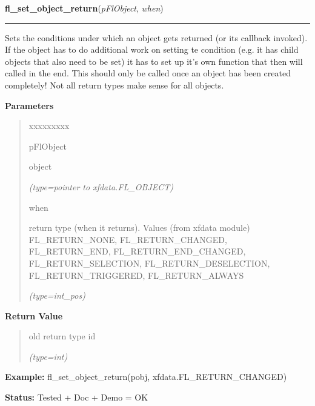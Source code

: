 \hspace{.8\funcindent}\begin{boxedminipage}{\funcwidth}

    \raggedright \textbf{fl\_set\_object\_return}(\textit{pFlObject}, \textit{when})

    \vspace{-1.5ex}

    \rule{\textwidth}{0.5\fboxrule}
\setlength{\parskip}{2ex}
    Sets the conditions under which an object gets returned (or its 
    callback invoked). If the object has to do additional work on setting 
    te condition (e.g. it has child objects that also need to be set) it 
    has to set up it's own function that then will called in the end. This 
    should only be called once an object has been created completely! Not 
    all return types make sense for all objects.

\setlength{\parskip}{1ex}
      \textbf{Parameters}
      \vspace{-1ex}

      \begin{quote}
        \begin{Ventry}{xxxxxxxxx}

          \item[pFlObject]

          object

            {\it (type=pointer to xfdata.FL\_OBJECT)}

          \item[when]

          return type (when it returns). Values (from xfdata module) 
          FL\_RETURN\_NONE, FL\_RETURN\_CHANGED, FL\_RETURN\_END, 
          FL\_RETURN\_END\_CHANGED, FL\_RETURN\_SELECTION, 
          FL\_RETURN\_DESELECTION, FL\_RETURN\_TRIGGERED, 
          FL\_RETURN\_ALWAYS

            {\it (type=int\_pos)}

        \end{Ventry}

      \end{quote}

      \textbf{Return Value}
    \vspace{-1ex}

      \begin{quote}
      old return type id

      {\it (type=int)}

      \end{quote}

\textbf{Example:} fl\_set\_object\_return(pobj, xfdata.FL\_RETURN\_CHANGED)



\textbf{Status:} Tested + Doc + Demo = OK



    \end{boxedminipage}

